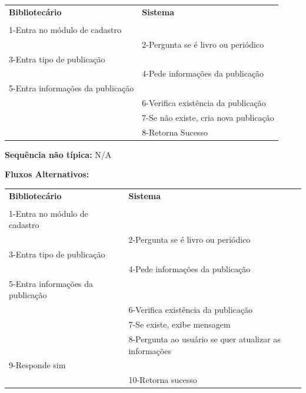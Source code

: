 \documentclass[
	12pt,				%
	openright,			%
	oneside,			%
	a4paper,			%
	english,			%
	brazil				%
	]{abntex2}
\begin{document}
\begin{table}[H]
\ABNTEXfontereduzida
\begin{center}
\begin{tabular}{p{5.5cm} p{5.5cm}}
    \textbf{Bibliotecário} & \textbf{Sistema}\\
     & \\
    1-Entra no módulo de cadastro & \\
     & 2-Pergunta se é livro ou periódico\\
    3-Entra tipo de publicação & \\
     & 4-Pede informações da publicação\\
    5-Entra informações da publicação & \\
     & 6-Verifica existência da publicação\\
     & 7-Se não existe, cria nova publicação\\
     & 8-Retorna Sucesso\\
\end{tabular}
\end{center}
\end{table}

\textbf{Sequência não típica:} N/A

\textbf{Fluxos Alternativos:}

\begin{table}[H]
\ABNTEXfontereduzida
\begin{center}
\begin{tabular}{p{5.5cm} p{5.5cm}}
    \textbf{Bibliotecário} & \textbf{Sistema}\\
     & \\
    1-Entra no módulo de cadastro& \\
     & 2-Pergunta se é livro ou periódico\\
    3-Entra tipo de publicação & \\
     & 4-Pede informações da publicação\\
    5-Entra informações da publicação & \\
     & 6-Verifica existência da publicação\\
     & 7-Se existe, exibe mensagem\\
     & 8-Pergunta ao usuário se quer atualizar as informações\\
    9-Responde sim & \\
     & 10-Retorna sucesso\\
\end{tabular}
\end{center}
\end{table}
\end{document}
